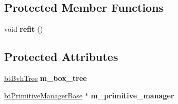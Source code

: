 \subsection*{Protected Member Functions}
\begin{DoxyCompactItemize}
\item 
\hypertarget{classbt_g_impact_bvh_afd14c2dcbbc9ceb6e13d0dee860faa48}{void {\bfseries refit} ()}\label{classbt_g_impact_bvh_afd14c2dcbbc9ceb6e13d0dee860faa48}

\end{DoxyCompactItemize}
\subsection*{Protected Attributes}
\begin{DoxyCompactItemize}
\item 
\hypertarget{classbt_g_impact_bvh_acfa1fa978bdc38e527f3b776d390e8e4}{\hyperlink{classbt_bvh_tree}{bt\+Bvh\+Tree} {\bfseries m\+\_\+box\+\_\+tree}}\label{classbt_g_impact_bvh_acfa1fa978bdc38e527f3b776d390e8e4}

\item 
\hypertarget{classbt_g_impact_bvh_ae1278d754c08bce1f1863c1e172e89ec}{\hyperlink{classbt_primitive_manager_base}{bt\+Primitive\+Manager\+Base} $\ast$ {\bfseries m\+\_\+primitive\+\_\+manager}}\label{classbt_g_impact_bvh_ae1278d754c08bce1f1863c1e172e89ec}

\end{DoxyCompactItemize}
